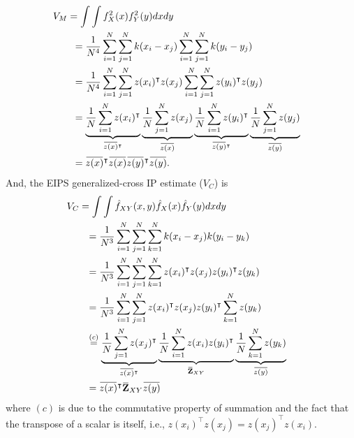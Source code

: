 \documentclass[8pt,twocolumn]{IEEEtran}
\newcommand{\overbar}[1]{\mkern 1.5mu\overline{\mkern-1.5mu#1\mkern-1.5mu}\mkern 1.5mu}
\begin{document}
\begin{align}
\lefteqn{V_M = \int\int f^2_{X}(x)f^2_Y(y)dxdy}\nonumber\\
& & & & &= \frac{1}{N^4}\sum_{i=1}^{N}\sum_{j=1}^{N} k(x_i-x_j)\sum_{i=1}^{N}\sum_{j=1}^{N}k(y_i-y_j)\nonumber\\
& & & & &= \frac{1}{N^4}\sum_{i=1}^{N}\sum_{j=1}^{N} z(x_i)^\intercal z(x_j)\sum_{i=1}^{N}\sum_{j=1}^{N}z(y_i)^\intercal z(y_j)\nonumber\\
& & & & &= \underbrace{\frac{1}{N}\sum_{i=1}^{N}z(x_i)^\intercal}_{\overbar{z(x)}^\intercal}\underbrace{\frac{1}{N}\sum_{j=1}^{N}z(x_j)}_{\overbar{z(x)}}\underbrace{\frac{1}{N}\sum_{i=1}^{N}z(y_i)^\intercal}_{\overbar{z(y)}^\intercal}\underbrace{\frac{1}{N}\sum_{j=1}^{N} z(y_j)}_{\overbar{z(y)}}\nonumber\\
& & & & &= \overbar{z(x)}^\intercal \overbar{z(x)}\overbar{z(y)}^\intercal\overbar{z(y)}.
\end{align}
And, the EIPS generalized-cross IP estimate ($V_C$) is
\begin{align}
\lefteqn{V_C = \int\int \hat{f}_{XY}(x,y)\hat{f}_X(x)\hat{f}_Y(y)dxdy}\nonumber\\
& & & & &= \frac{1}{N^3}\sum_{i=1}^{N}\sum_{j=1}^{N} \sum_{k=1}^{N}k(x_i-x_j)k(y_i-y_k)\nonumber\\
& & & & &= \frac{1}{N^3}\sum_{i=1}^{N}\sum_{j=1}^{N} \sum_{k=1}^{N}z(x_i)^\intercal z(x_j)z(y_i)^\intercal z(y_k)\nonumber\\
& & & & &= \frac{1}{N^3}\sum_{i=1}^{N}\sum_{j=1}^{N} z(x_i)^\intercal z(x_j)z(y_i)^\intercal\sum_{k=1}^{N}z(y_k)\nonumber\\
& & & & &\stackrel{(c)}{=} \underbrace{\frac{1}{N}\sum_{j=1}^{N}z(x_j)^\intercal}_{\overbar{z(x)}^\intercal}\underbrace{\frac{1}{N}\sum_{i=1}^{N}z(x_i)z(y_i)^\intercal}_{\overbar{\mathbf{Z}}_{XY}}\underbrace{\frac{1}{N}\sum_{k=1}^{N}z(y_k)}_{\overbar{z(y)}}\nonumber\\
& & & & &=\overbar{z(x)}^\intercal \overbar{\mathbf{Z}}_{XY}\overbar{z(y)}
\end{align}
where $(c)$ is due to the commutative property of summation and the fact that the transpose of a scalar is itself, i.e., $z(x_i)^\intercal z(x_j) = z(x_j)^\intercal z(x_i)$.
\end{document}
